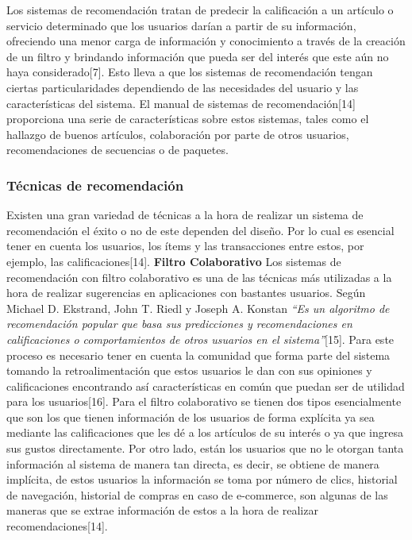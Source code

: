 \documentclass[12pt,letterpaper,openany]{book}
\begin{document}
Los sistemas de recomendación tratan de predecir la calificación a un artículo o servicio determinado que los usuarios darían a partir de su información, ofreciendo una menor carga de información y conocimiento a través de la creación de un filtro y brindando información que pueda ser del interés que este aún no haya considerado[7]. Esto lleva a que los sistemas de recomendación tengan ciertas particularidades dependiendo de las necesidades del usuario y las características del sistema. El manual de sistemas de recomendación[14] proporciona una serie de características sobre estos sistemas, tales como el hallazgo de buenos artículos, colaboración por parte de otros usuarios, recomendaciones de secuencias o de paquetes.

\subsubsection{Técnicas de recomendación}
Existen una gran variedad de técnicas a la hora de realizar un sistema de recomendación el éxito o no de este dependen del diseño. Por lo cual es esencial tener en cuenta los usuarios, los ítems y las transacciones entre estos, por ejemplo, las calificaciones[14].
\vspace{5mm}\newline
\textbf{Filtro Colaborativo}\newline
Los sistemas de recomendación con filtro colaborativo es una de las técnicas más utilizadas a la hora de realizar sugerencias en aplicaciones con bastantes usuarios. Según Michael D. Ekstrand, John T. Riedl y Joseph A. Konstan \textit{“Es un algoritmo de recomendación popular que basa sus predicciones y recomendaciones en calificaciones o comportamientos de otros usuarios en el sistema”}[15]. Para este proceso es necesario tener en cuenta la comunidad que forma parte del sistema tomando la retroalimentación que estos usuarios le dan con sus opiniones y calificaciones encontrando así características en común que puedan ser de utilidad para los usuarios[16].
Para el filtro colaborativo se tienen dos tipos esencialmente que son los que tienen información de los usuarios de forma explícita ya sea mediante las calificaciones que les dé a los artículos de su interés o ya que ingresa sus gustos directamente. Por otro lado, están los usuarios que no le otorgan tanta información al sistema de manera tan directa, es decir, se obtiene de manera implícita, de estos usuarios la información se toma por número de clics, historial de navegación, historial de compras en caso de e-commerce, son algunas de las maneras que se extrae información de estos a la hora de realizar recomendaciones[14].
\end{document}
